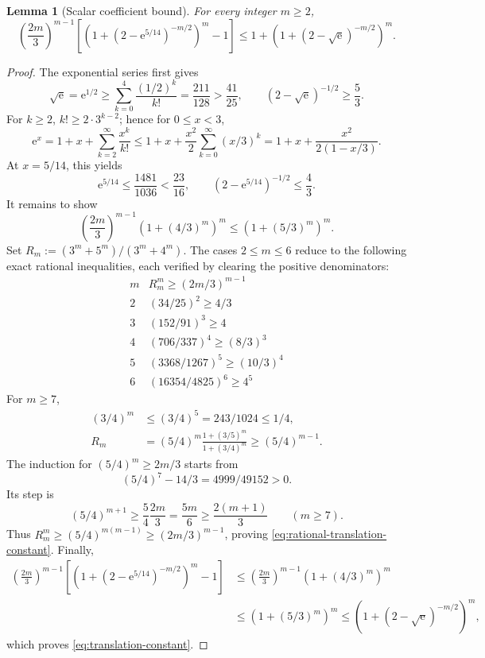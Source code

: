 \documentclass[11pt]{article}
\newtheorem{lemma}{Lemma}
\begin{document}
\begin{lemma}[Scalar coefficient bound]\label{lem:translation-constant}
For every integer $m\ge2$,
\begin{equation}\label{eq:translation-constant}
\left(\frac{2m}{3}\right)^{m-1}\left[\left(1+(2-\mathrm e^{5/14})^{-m/2}\right)^m-1\right]\le1+\left(1+(2-\sqrt{\mathrm e})^{-m/2}\right)^m.
\end{equation}
\end{lemma}
\begin{proof}
The exponential series first gives
\[
\sqrt{\mathrm e}=\mathrm e^{1/2}\ge\sum_{k=0}^4\frac{(1/2)^k}{k!}=\frac{211}{128}>\frac{41}{25},\qquad (2-\sqrt{\mathrm e})^{-1/2}\ge\frac53.
\]
For $k\ge2$, $k!\ge2\cdot3^{k-2}$; hence for $0\le x<3$,
\[
\mathrm e^x=1+x+\sum_{k=2}^{\infty}\frac{x^k}{k!}\le1+x+\frac{x^2}{2}\sum_{k=0}^{\infty}(x/3)^k=1+x+\frac{x^2}{2(1-x/3)}.
\]
At $x=5/14$, this yields
\[
\mathrm e^{5/14}\le\frac{1481}{1036}<\frac{23}{16},\qquad (2-\mathrm e^{5/14})^{-1/2}\le\frac43.
\]
It remains to show
\begin{equation}\label{eq:rational-translation-constant}
\left(\frac{2m}{3}\right)^{m-1}\left(1+(4/3)^m\right)^m\le\left(1+(5/3)^m\right)^m.
\end{equation}
Set $R_m:=(3^m+5^m)/(3^m+4^m)$. The cases $2\le m\le6$ reduce to the following exact rational inequalities, each verified by clearing the positive denominators:
\[
\begin{array}{c|c}
m&R_m^m\ge(2m/3)^{m-1}\\ \hline
2&(34/25)^2\ge4/3\\
3&(152/91)^3\ge4\\
4&(706/337)^4\ge(8/3)^3\\
5&(3368/1267)^5\ge(10/3)^4\\
6&(16354/4825)^6\ge4^5
\end{array}
\]
For $m\ge7$,
\begin{align*}
(3/4)^m&\le(3/4)^5=243/1024\le1/4,\\
R_m&=(5/4)^m\frac{1+(3/5)^m}{1+(3/4)^m}\ge(5/4)^{m-1}.
\end{align*}
The induction for $(5/4)^m\ge2m/3$ starts from
\[
(5/4)^7-14/3=4999/49152>0.
\]
Its step is
\[
(5/4)^{m+1}\ge\frac54\frac{2m}{3}=\frac{5m}{6}\ge\frac{2(m+1)}3\qquad(m\ge7).
\]
Thus $R_m^m\ge(5/4)^{m(m-1)}\ge(2m/3)^{m-1}$, proving \eqref{eq:rational-translation-constant}. Finally,
\begin{align*}
\left(\frac{2m}{3}\right)^{m-1}\left[\left(1+(2-\mathrm e^{5/14})^{-m/2}\right)^m-1\right]&\le\left(\frac{2m}{3}\right)^{m-1}\left(1+(4/3)^m\right)^m\\
&\le\left(1+(5/3)^m\right)^m\le\left(1+(2-\sqrt{\mathrm e})^{-m/2}\right)^m,
\end{align*}
which proves \eqref{eq:translation-constant}.
\end{proof}
\end{document}

